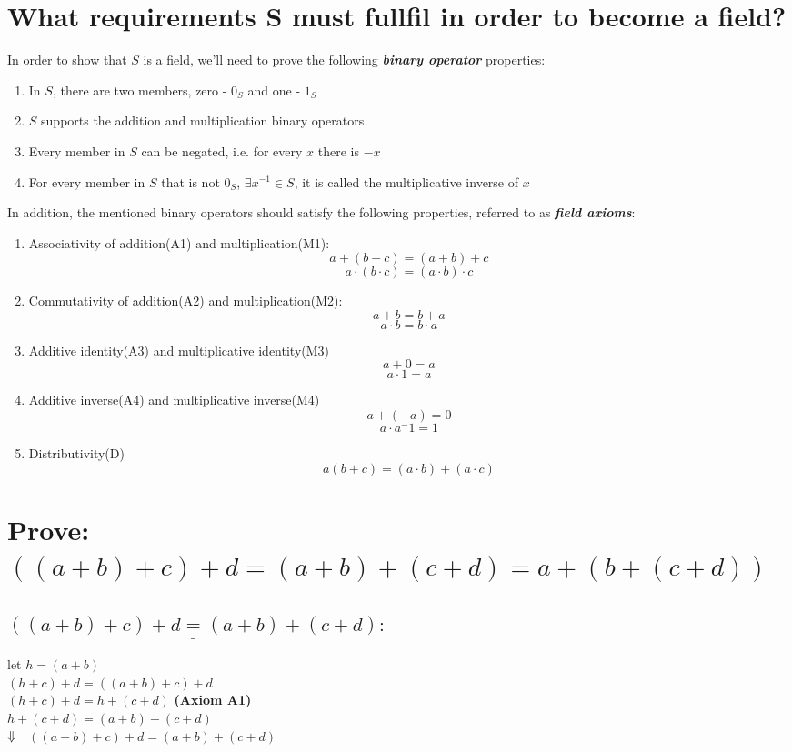 \documentclass[a4paper, 12pt]{article}
\renewcommand{\d}{\\\ensuremath{\Downarrow\\~}}
\begin{document}
\begin{titlepage}
\end{titlepage}

\section{What requirements S must fullfil in order to become a field?}
In order to show that $S$ is a field, we'll need to prove the following \textit{\textbf{binary operator}} properties:
\begin{enumerate}
    \item In $S$, there are two members, zero - $0_S$ and one - $1_S$
    \item $S$ supports the addition and multiplication binary operators
    \item Every member in $S$ can be negated, i.e. for every $x$ there is $-x$
    \item For every member in $S$ that is not $0_S$, $\exists{x^{-1}}\in{S}$, it is called the multiplicative inverse of $x$
\end{enumerate}
In addition, the mentioned binary operators should satisfy the following properties, referred to as \textit{\textbf{field axioms}}:
\begin{enumerate}
    \item Associativity of addition(A1) and multiplication(M1):
        $$ a+(b+c)=(a+b)+c $$
        $$ a\cdot(b\cdot{c})=(a\cdot{b})\cdot{c} $$
    \item Commutativity of addition(A2) and multiplication(M2):
        $$ a+b = b+a $$
        $$ a\cdot{b} = b\cdot{a} $$
    \item Additive identity(A3) and multiplicative identity(M3)
        $$ a+0=a $$
        $$ a\cdot{1}=a $$
    \item Additive inverse(A4) and multiplicative inverse(M4)
        $$ a + (-a) = 0 $$
        $$ a \cdot a^-1 = 1 $$
    \item Distributivity(D)
        $$ a(b + c) = (a \cdot{b})+(a \cdot{c}) $$
\end{enumerate}
\pagebreak

\section{Prove: $ ((a + b) + c) + d = (a + b) + (c + d) = a + (b + (c + d)) $}
\subsection{$ \underline{((a+b)+c)+d=(a+b)+(c+d)}: $}
let $h=(a+b)$\\
$(h+c)+d=((a+b)+c)+d$\\
$(h+c)+d = h+(c+d)$ \textbf{(Axiom A1)}\\
$ h+(c+d) = (a+b)+(c+d) $
\d
$((a+b)+c)+d=(a+b)+(c+d)$
\end{document}
